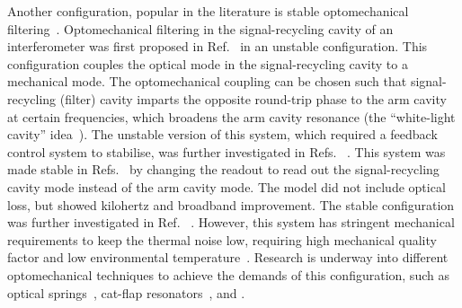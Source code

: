 Another configuration, popular  in the literature is stable optomechanical filtering~\cite{Li2020,Li2021,Miao2015,Miao2018,Page2018}. Optomechanical filtering in the signal-recycling cavity of an interferometer was first proposed in Ref.~\cite{Miao2015} in an unstable configuration. This configuration couples the optical mode in the signal-recycling cavity to a mechanical mode. The optomechanical coupling can be chosen such that signal-recycling (filter) cavity imparts the opposite round-trip phase to the arm cavity at certain frequencies, which broadens the arm cavity resonance (the ``white-light cavity'' idea~\cite{}).
The unstable version of this system, which required a feedback control system to stabilise, was further investigated in Refs.~\cite{Miao2018,Page2018,} . 
This system was made stable in Refs.~\cite{Li2020} by changing the readout to read out the signal-recycling cavity mode instead of the arm cavity mode. The model did not include optical loss, but showed kilohertz and broadband improvement. The stable configuration was further investigated in Ref.~\cite{Li2021} .
However, this system has stringent mechanical requirements to keep the thermal noise low, requiring high mechanical quality factor and low environmental temperature~\cite{}. Research is underway into different optomechanical techniques to achieve the demands of this configuration, such as optical springs~\cite{}, cat-flap resonators~\cite{}, and .

